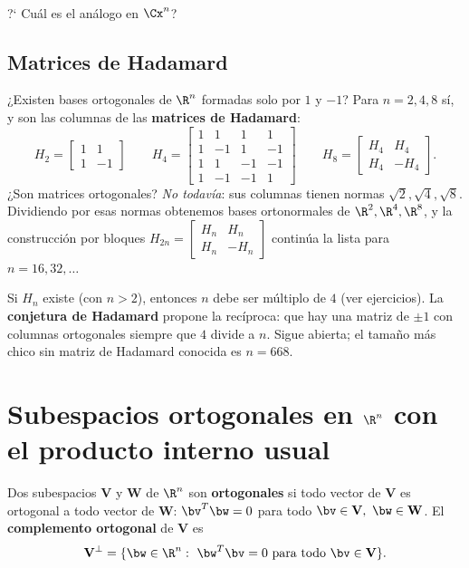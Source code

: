 \

?` Cu\'al es el an\'alogo en $\Cx^n$?

\subsection*{Matrices de Hadamard}

¿Existen bases ortogonales de $\R^n$ formadas solo por $1$ y $-1$? Para
$n=2,4,8$ sí, y son las columnas de las \textbf{matrices de Hadamard}:
\[
H_2=\begin{bmatrix}1&1\\1&-1\end{bmatrix}\qquad
H_4=\begin{bmatrix}1&1&1&1\\1&-1&1&-1\\1&1&-1&-1\\1&-1&-1&1\end{bmatrix}
\qquad
H_8=\begin{bmatrix}H_4&H_4\\ H_4&-H_4\end{bmatrix}.
\]
¿Son matrices ortogonales? \emph{No todavía}: sus columnas tienen normas
$\sqrt2,\sqrt4,\sqrt8$. Dividiendo por esas normas obtenemos bases
ortonormales de $\R^2,\R^4,\R^8$, y la construcción por bloques
$H_{2n}=\left[\begin{smallmatrix}H_n&H_n\\H_n&-H_n\end{smallmatrix}\right]$
continúa la lista para $n=16,32,\dots$

\begin{observacion}
Si $H_n$ existe (con $n>2$), entonces $n$ debe ser múltiplo de $4$ (ver
ejercicios). La \textbf{conjetura de Hadamard} propone la recíproca: que hay
una matriz de $\pm1$ con columnas ortogonales siempre que $4$ divide a $n$.
Sigue abierta; el tamaño más chico sin matriz de Hadamard conocida es
$n=668$.
\end{observacion}

\section{Subespacios ortogonales en $\R^n$ con el producto interno usual}\label{sec:cuatro-ort}

\begin{definicion}
Dos subespacios $\mathbf{V}$ y $\mathbf{W}$ de $\R^n$ son
\textbf{ortogonales} si todo vector de $\mathbf{V}$ es ortogonal a todo
vector de $\mathbf{W}$: $\bv^T\bw=0$ para todo
$\bv\in\mathbf{V},\ \bw\in\mathbf{W}$.
El \textbf{complemento ortogonal} de $\mathbf{V}$ es
\[
\mathbf{V}^{\perp}=\{\bw\in\R^n:\ \bw^T\bv=0
\text{ para todo }\bv\in\mathbf{V}\}.
\]
\end{definicion}

